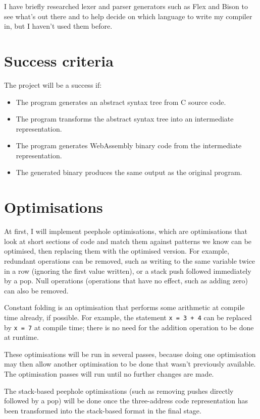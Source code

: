 I have briefly researched lexer and parser generators such as Flex and Bison to see what's out there and to help decide on which language to write my compiler in, but I haven't used them before.

\section*{Success criteria}

The project will be a success if:

\begin{itemize}
\item The program generates an abstract syntax tree from C source code.
\item The program transforms the abstract syntax tree into an intermediate representation.
\item The program generates WebAssembly binary code from the intermediate representation.
\item The generated binary produces the same output as the original program.
\end{itemize}


\section*{Optimisations}

At first, I will implement peephole optimisations, which are optimisations that look at short sections of code and match them against patterns we know can be optimised, then replacing them with the optimised version.
For example, redundant operations can be removed, such as writing to the same variable twice in a row (ignoring the first value written), or a stack push followed immediately by a pop.
Null operations (operations that have no effect, such as adding zero) can also be removed.

Constant folding is an optimisation that performs some arithmetic at compile time already, if possible. For example, the statement \texttt{x = 3 + 4} can be replaced by \texttt{x = 7} at compile time; there is no need for the addition operation to be done at runtime.

These optimisations will be run in several passes, because doing one optimisation may then allow another optimisation to be done that wasn't previously available. The optimisation passes will run until no further changes are made.

The stack-based peephole optimisations (such as removing pushes directly followed by a pop) will be done once the three-address code representation has been transformed into the stack-based format in the final stage.

